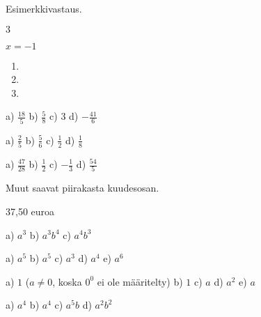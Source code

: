 \begin{Vastaus}{1}
Esimerkkivastaus.
\end{Vastaus}
\begin{Vastaus}{2}
$3$
\end{Vastaus}
\begin{Vastaus}{3}
$x=-1$
\end{Vastaus}
\begin{Vastaus}{4}
\begin{enumerate}
\item
\item
\item

\end{enumerate}
\end{Vastaus}
\begin{Vastaus}{6}
        a) $\frac{18}{5}$
        b) $\frac{5}{8}$
        c) $3$
        d) $-\frac{41}{6}$
    
\end{Vastaus}
\begin{Vastaus}{7}
        a) $\frac{2}{5}$
        b) $\frac{5}{6}$
        c) $\frac{1}{2}$
        d) $\frac{1}{8}$
    
\end{Vastaus}
\begin{Vastaus}{8}
        a) $\frac{47}{28}$
        b) $\frac{1}{2}$
        c) $-\frac{1}{3}$
        d) $\frac{54}{5}$
    
\end{Vastaus}
\begin{Vastaus}{9}
        Muut saavat piirakasta kuudesosan.
    
\end{Vastaus}
\begin{Vastaus}{10}
        37,50 euroa
    
\end{Vastaus}
\begin{Vastaus}{11}
a) $a^3$ \qquad b) $a^3b^4$ \qquad c) $a^4b^3$
\end{Vastaus}
\begin{Vastaus}{12}
a) $a^5$ \qquad b) $a^5$ \qquad c) $a^3$ \qquad d) $a^4$ \qquad e) $a^6$
\end{Vastaus}
\begin{Vastaus}{13}
a) $1$ \quad ($a\neq0$, koska $0^0$ ei ole määritelty) \qquad b) $1$ \qquad c) $a$ \qquad d) $a^2$ \qquad
e) $a$
\end{Vastaus}
\begin{Vastaus}{14}
a) $ a^4$ \qquad b) $a^4$ \qquad c) $a^5b$ \qquad d) $a^2b^2$
\end{Vastaus}

